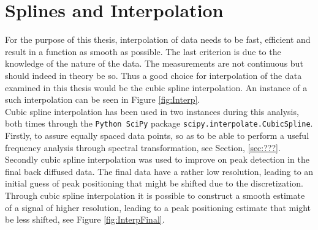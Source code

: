 \documentclass[../../CompleteThesis2/Complete_2ndDraft]{subfiles}
\begin{document}



\section[Splines and Interpolation]{Splines and Interpolation}	
\label{Sec:CompMeths_SplinesAndInterpolation}
For the purpose of this thesis, interpolation of data needs to be fast, efficient and result in a function as smooth as possible. The last criterion is due to the knowledge of the nature of the data. The measurements are not continuous but should indeed in theory be so. Thus a good choice for interpolation of the data examined in this thesis would be the cubic spline interpolation. An instance of a such interpolation can be seen in Figure \ref{fig:Interp}.\\
Cubic spline interpolation has been used in two instances during this analysis, both times through the \lstinline[language=Python]|Python SciPy| package \lstinline[language=Python]|scipy.interpolate.CubicSpline|. Firstly, to assure equally spaced data points, so as to be able to perform a useful frequency analysis through spectral transformation, see Section, \ref{sec:???}. Secondly cubic spline interpolation was used to improve on peak detection in the final back diffused data. The final data have a rather low resolution, leading to an initial guess of peak positioning that might be shifted due to the discretization. Through cubic spline interpolation it is possible to construct a smooth estimate of a signal of higher resolution, leading to a peak positioning estimate that might be less shifted, see Figure \ref{fig:InterpFinal}.
\end{document}
